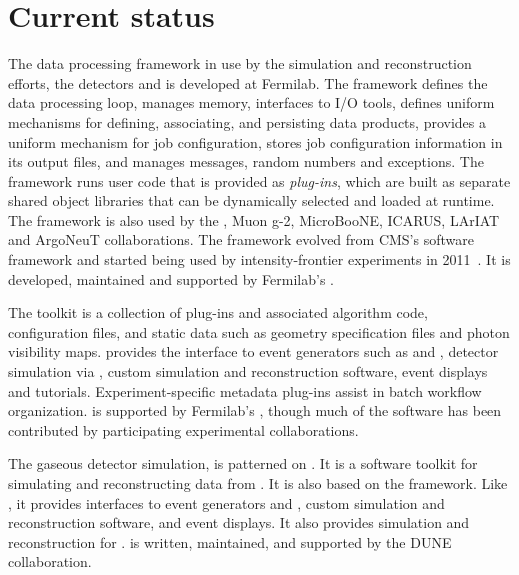 \documentclass[../main-v1.tex]{subfiles}
\begin{document}
\section{Current status }

The data processing framework in use by the  simulation and reconstruction efforts, the  detectors and  is  developed at Fermilab.  The  framework defines the data processing loop, manages memory, interfaces to I/O tools, defines uniform mechanisms for defining, associating, and persisting data products, provides a uniform mechanism for job configuration, stores job configuration information in its output files, and manages messages, random numbers and exceptions.  The  framework runs user code that is provided as {\it plug-ins}, which are built as separate shared object libraries that can be dynamically selected and loaded at runtime.  The  framework is also used by the , Muon g-2, MicroBooNE, ICARUS, LArIAT and ArgoNeuT collaborations.  The  framework evolved from CMS's software framework and started being used by intensity-frontier experiments in 2011~\cite{Green:2012gv}. It is developed, maintained and supported by Fermilab's .

The  toolkit is a collection of  plug-ins and associated algorithm code, configuration files, and static data such as geometry specification files and photon visibility maps.   provides the interface to event generators such as  and , detector simulation via , custom simulation and reconstruction software, event displays and tutorials.  Experiment-specific metadata plug-ins assist in batch workflow organization.   is supported by Fermilab's , though much of the software has been contributed by participating experimental collaborations.


The gaseous detector simulation,  is patterned on .  It is a software toolkit for simulating and reconstructing data from .  It is also based on the  framework.  Like , it provides interfaces to event generators and , custom simulation and reconstruction software, and event displays.  It also provides simulation and reconstruction for .   is written, maintained, and supported by the DUNE collaboration.
\end{document}
